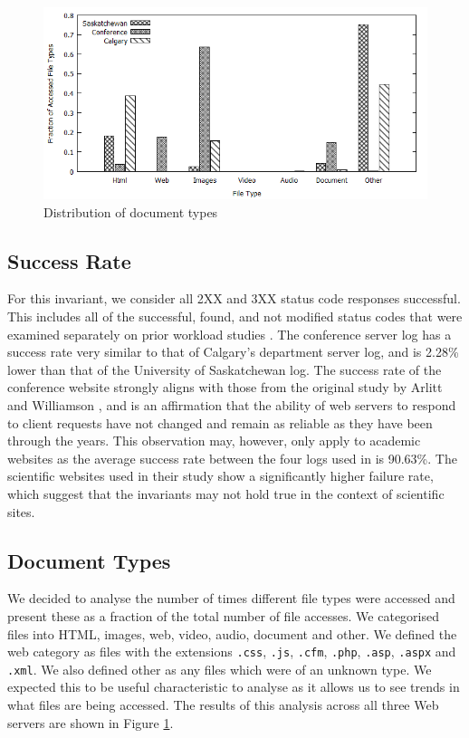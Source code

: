 \documentclass[10pt,conference]{IEEEtran}
\begin{document}
\begin{figure}
    \includegraphics{images/filetype}
    \caption{Distribution of document types}\label{fig:file_types}
\end{figure}

\subsection{Success Rate} %
\label{sub:success_rate}
For this invariant, we consider all 2XX and 3XX status code responses successful. This includes all of the successful, found, and not modified status codes that were examined separately on prior workload studies \cite{keynote, Faber}. The conference server log has a success rate very similar to that of Calgary’s department server log, and is 2.28\% lower than that of the University of Saskatchewan log. The success rate of the conference website strongly aligns with those from the original study by Arlitt and Williamson \cite{keynote}, and is an affirmation that the ability of web servers to respond to client requests have not changed and remain as reliable as they have been through the years. This observation may, however, only apply to academic websites as the average success rate between the four logs used in \cite{keynote, Faber} is 90.63\%. The scientific websites used in their study show a significantly higher failure rate, which suggest that the invariants may not hold true in the context of scientific sites.

\subsection{Document Types}\label{sub:doc_types}
We decided to analyse the number of times different file types were accessed and present these as a fraction of the total number of file accesses. We categorised files into HTML, images, web, video, audio, document and other. We defined the web category as files with the extensions \texttt{.css}, \texttt{.js}, \texttt{.cfm}, \texttt{.php}, \texttt{.asp}, \texttt{.aspx} and \texttt{.xml}. We also defined other as any files which were of an unknown type. We expected this to be useful characteristic to analyse as it allows us to see trends in what files are being accessed. The results of this analysis across all three Web servers are shown in Figure \ref{fig:file_types}.
\end{document}
